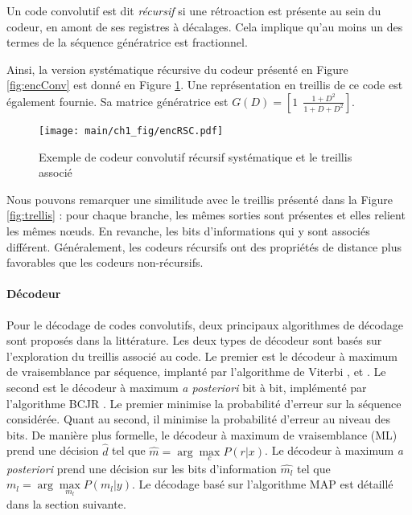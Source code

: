 Un code convolutif est dit \emph{récursif} si une rétroaction est présente au sein du codeur, en amont de ses registres à décalages. Cela 
implique qu'au moins un des termes de la séquence génératrice est fractionnel. 

Ainsi, la version systématique récursive du codeur présenté en Figure \ref{fig:encConv} est donné en Figure 
\ref{fig:encRSC}. Une représentation en treillis de ce code est également fournie. Sa matrice génératrice est $G(D) = \left[ 1 ~~\frac{1+D^2}{1+D+D^2} \right]$. 
\begin{figure}[!h]
	\centering
	\texttt{[image: main/ch1\_fig/encRSC.pdf]}
	\caption{\label{fig:encRSC} Exemple de codeur convolutif récursif systématique et le treillis associé}
\end{figure}
Nous pouvons remarquer une similitude avec le treillis présenté dans la Figure \ref{fig:trellis} : pour chaque branche,
les mêmes sorties sont présentes et elles relient les mêmes nœuds. En revanche, les bits d'informations qui y sont 
associés différent. Généralement, les codeurs récursifs ont des propriétés de distance plus favorables que les codeurs
non-récursifs.

\paragraph*{Décodeur}\label{sec:ml}
Pour le décodage de codes convolutifs, deux principaux algorithmes de décodage sont proposés dans la littérature. Les 
deux types de décodeur sont basés sur l'exploration du treillis associé au code. Le premier est le décodeur à maximum de 
vraisemblance par séquence, implanté par l'algorithme de Viterbi \cite{viterbi}, \cite{viterbi2} et \cite{forney73viterbi}. 
Le second est le décodeur à maximum {\it a posteriori} bit à bit, implémenté par l'algorithme BCJR \cite{bcjr}. Le premier 
minimise la probabilité d'erreur sur la séquence considérée.
Quant au second, il minimise la probabilité d'erreur au niveau des bits. De 
manière plus formelle, le décodeur à maximum de vraisemblance (ML) prend une décision $\hat{d}$ tel que $\hat{m} = 
\arg\max\limits_c P(r|x)$. Le décodeur à maximum {\it a posteriori} prend une décision sur les bits d'information 
$\hat{m_l}$ tel que $\hat{m_l} = \arg\max\limits_{m_l} P(m_l|y)$. Le décodage basé sur l'algorithme MAP est détaillé 
dans la section suivante.


